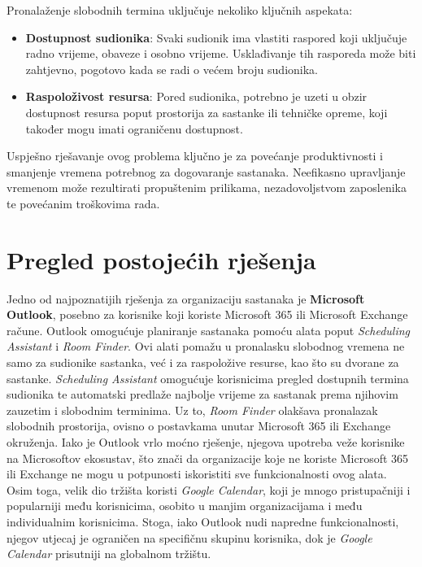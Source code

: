 \documentclass{foi}
\begin{document}
Pronalaženje slobodnih termina uključuje nekoliko ključnih aspekata:
\begin{itemize}
    \item \textbf{Dostupnost sudionika}: Svaki sudionik ima vlastiti raspored koji uključuje radno vrijeme, obaveze i osobno vrijeme. Usklađivanje tih rasporeda može biti zahtjevno, pogotovo kada se radi o većem broju sudionika.
    \item \textbf{Raspoloživost resursa}: Pored sudionika, potrebno je uzeti u obzir dostupnost resursa poput prostorija za sastanke ili tehničke opreme, koji također mogu imati ograničenu dostupnost.
\end{itemize}


Uspješno rješavanje ovog problema ključno je za povećanje produktivnosti i smanjenje vremena potrebnog za dogovaranje sastanaka. Neefikasno upravljanje vremenom može rezultirati propuštenim prilikama, nezadovoljstvom zaposlenika te povećanim troškovima rada.

\section{Pregled postojećih rješenja}

Jedno od najpoznatijih rješenja za organizaciju sastanaka je \textbf{Microsoft Outlook}, posebno za korisnike koji koriste Microsoft 365 ili Microsoft Exchange račune. Outlook omogućuje planiranje sastanaka pomoću alata poput \textit{Scheduling Assistant} i \textit{Room Finder}. Ovi alati pomažu u pronalasku slobodnog vremena ne samo za sudionike sastanka, već i za raspoložive resurse, kao što su dvorane za sastanke. \textit{Scheduling Assistant} omogućuje korisnicima pregled dostupnih termina sudionika te automatski predlaže najbolje vrijeme za sastanak prema njihovim zauzetim i slobodnim terminima. Uz to, \textit{Room Finder} olakšava pronalazak slobodnih prostorija, ovisno o postavkama unutar Microsoft 365 ili Exchange okruženja. Iako je Outlook vrlo moćno rješenje, njegova upotreba veže korisnike na Microsoftov ekosustav, što znači da organizacije koje ne koriste Microsoft 365 ili Exchange ne mogu u potpunosti iskoristiti sve funkcionalnosti ovog alata. Osim toga, velik dio tržišta koristi \textit{Google Calendar}, koji je mnogo pristupačniji i popularniji među korisnicima, osobito u manjim organizacijama i među individualnim korisnicima. Stoga, iako Outlook nudi napredne funkcionalnosti, njegov utjecaj je ograničen na specifičnu skupinu korisnika, dok je \textit{Google Calendar} prisutniji na globalnom tržištu.
\newpage
\end{document}
